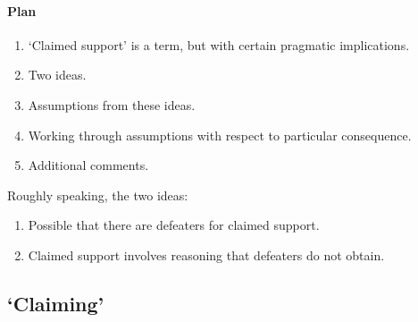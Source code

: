 \paragraph*{Plan}

\begin{note}
  \begin{enumerate}
  \item `Claimed support' is a term, but with certain pragmatic implications.
  \item Two ideas.
  \item Assumptions from these ideas.
  \item Working through assumptions with respect to particular consequence.
  \item Additional comments.
  \end{enumerate}
\end{note}

\begin{note}
  Roughly speaking, the two ideas:
  \begin{enumerate}
  \item Possible that there are defeaters for claimed support.
  \item Claimed support involves reasoning that defeaters do not obtain.
  \end{enumerate}
\end{note}

\subsection{`Claiming'}
\label{sec:claiming}

